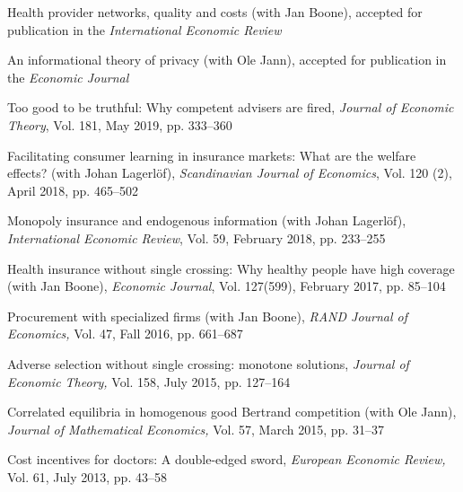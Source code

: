 \documentclass[a4paper]{article}
\renewenvironment{itemize}{
  \begin{list}{}{
    \setlength{\leftmargin}{1.5em}
  }
}{
  \end{list}
}
\begin{document}
%
\begin{itemize}   
\item Health provider networks, quality and costs (with Jan Boone), accepted for publication in the \emph{International Economic Review}

\item An informational theory of privacy (with Ole Jann), accepted for publication in the \emph{Economic Journal}

\item Too good to be truthful: Why competent advisers are fired, \emph{Journal of Economic Theory}, Vol. 181, May 2019, pp. 333--360
  
\item Facilitating consumer learning in insurance markets: What are the welfare effects? (with Johan Lagerl\"of), \emph{Scandinavian Journal of Economics}, Vol. 120 (2), April 2018, pp. 465--502
  
\item Monopoly insurance and endogenous information (with Johan Lagerl\"of), \emph{International Economic Review}, Vol. 59, February 2018, pp. 233--255

\item Health insurance without single crossing: Why healthy
people have high coverage (with Jan Boone), \textit{Economic Journal}, Vol. 127(599), February 2017, pp. 85--104

\item Procurement with specialized firms (with Jan Boone), \textit{RAND Journal of Economics,} Vol. 47, Fall 2016, pp. 661--687

\item Adverse selection without single crossing: monotone solutions, \textit{Journal of Economic Theory,} Vol. 158, July 2015, pp. 127--164

\item Correlated equilibria in homogenous good Bertrand competition (with Ole Jann), \textit{Journal of Mathematical Economics,}  Vol. 57, March 2015, pp. 31--37

\item Cost incentives for doctors: A double-edged sword, \textit{European Economic Review,} Vol. 61, July 2013, pp. 43--58

\end{itemize}
\end{document}

